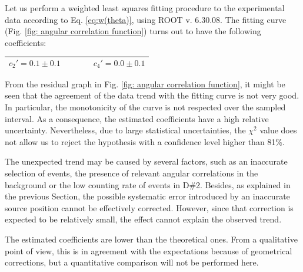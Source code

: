 \documentclass[a4paper]{article}
\begin{document}

Let us perform a weighted least squares fitting procedure to the experimental data according to Eq. \eqref{eq:w(theta)}, using ROOT v. 6.30.08. The fitting curve (Fig. \ref{fig: angular correlation function}) turns out to have the following coefficients:
\begin{table}[H]
    \centering
    \begin{tabular}{|c|}
    \hline
    \[ c_2'=0.1\pm0.1\quad\quad \quad \quad c_4'=0.0\pm0.1\] \\
    \hline
    \end{tabular}
\end{table}
From the residual graph in Fig. \ref{fig: angular correlation function}, it might be seen that the agreement of the data trend with the fitting curve is not very good. In particular, the monotonicity of the curve is not respected over the sampled interval. As a consequence, the estimated coefficients have a high relative uncertainty. Nevertheless, due to large statistical uncertainties, the $\chi^2$ value does not allow us to reject the hypothesis with a confidence level higher than 81\%. 

The unexpected trend may be caused by several factors, such as an inaccurate selection of events, the presence of relevant angular correlations in the background or the low counting rate of events in D\#2. Besides, as explained in the previous Section, the possible systematic error introduced by an inaccurate source position cannot be effectively corrected. However, since that correction is expected to be relatively small, the effect cannot explain the observed trend.

The estimated coefficients are lower than the theoretical ones. From a qualitative point of view, this is in agreement with the expectations because of geometrical corrections, but a quantitative comparison will not be performed here. %
    
\end{document}
